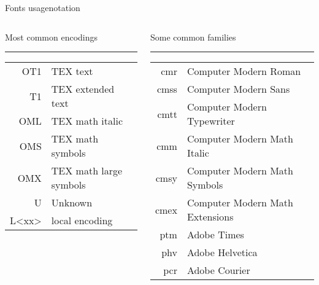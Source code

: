 \begin{frame}[fragile]{Fonts usage\magicPage}{notation}\relax

    \begin{columns}[t]
    \begin{column}{0.5\textwidth}
    
    Most common encodings\strut\hrule
    
    \begin{tabular}{rl}
         OT1 & TEX text\\
         T1 & TEX extended text\\
         OML & TEX math italic\\
         OMS & TEX math symbols\\ 
         OMX & TEX math large symbols\\
         U & Unknown\\ 
         L<xx>& local encoding
    \end{tabular}
    \end{column}
    
    \begin{column}{0.5\textwidth}
    
    Some common families\strut\hrule
    
    \begin{tabular}{r>{\footnotesize}l}
    
         cmr & Computer Modern Roman\\ 
         cmss & Computer Modern Sans\\ 
         cmtt & Computer Modern Typewriter\\ 
         cmm & Computer Modern Math Italic\\ 
         cmsy & Computer Modern Math Symbols\\ 
         cmex &  Computer Modern Math Extensions\\ 
         ptm & Adobe Times\\ 
         phv & Adobe Helvetica\\ 
         pcr &Adobe Courier
    \end{tabular}
    \end{column}
         
    \end{columns}
    \cprotect{}
\end{frame}


